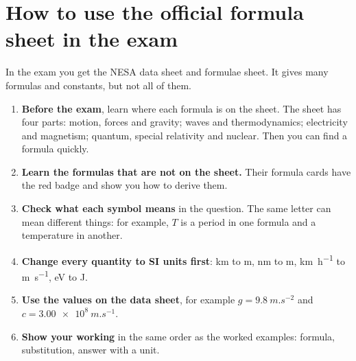 \section*{How to use the official formula sheet in the exam}

In the exam you get the NESA data sheet and formulae sheet. It gives many
formulas and constants, but not all of them.

\begin{enumerate}
  \item \textbf{Before the exam}, learn where each formula is on the sheet. The
        sheet has four parts: motion, forces and gravity; waves and
        thermodynamics; electricity and magnetism; quantum, special relativity
        and nuclear. Then you can find a formula quickly.
  \item \textbf{Learn the formulas that are not on the sheet.} Their formula
        cards have the red badge and show you how to derive them.
  \item \textbf{Check what each symbol means} in the question. The same letter
        can mean different things: for example, $T$ is a period in one formula
        and a temperature in another.
  \item \textbf{Change every quantity to SI units first}: km to m, nm to m,
        \si{km.h^{-1}} to \si{m.s^{-1}}, eV to J.
  \item \textbf{Use the values on the data sheet}, for example
        $g = \qty{9.8}{m.s^{-2}}$ and $c = \qty{3.00e8}{m.s^{-1}}$.
  \item \textbf{Show your working} in the same order as the worked examples:
        formula, substitution, answer with a unit.
\end{enumerate}
